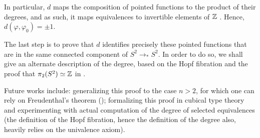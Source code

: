 \documentclass{easychair}
\newcommand{\Sp}{{S^2}}%
\newcommand{\ptdto}{\to_\ast}%
\begin{document}
In particular, $d$ maps the composition of
pointed functions to the product of their degrees, and as such, it
maps equivalences to invertible elements of $\mathbb{Z}$ . Hence,
$d(\varphi,\varphi_0) = \pm 1$.

The last step is to prove that $d$ identifies precisely these pointed
functions that are in the same connected component of
$\Sp \ptdto \Sp$. In order to do so, we shall give
an alternate description of the degree, based on the Hopf fibration
and the proof that $\pi_2(\Sp) \weq \ZZ$ in \cite[Ch.~8.6]{HoTT}.

Future works include: generalizing this proof to the case $n>2$, for
which one can rely on Freudenthal's theorem (\cite[Ch.~8.6]{HoTT});
formalizing this proof in cubical type theory and experimenting with
actual computation of the degree of selected equivalences (the
definition of the Hopf fibration, hence the definition of the degree
also, heavily relies on the univalence axiom).



\end{document}
